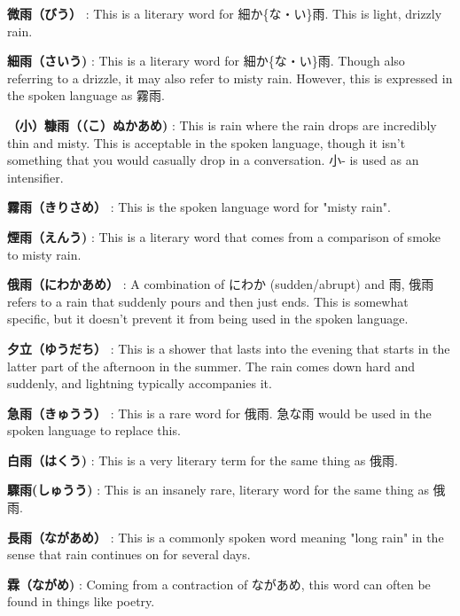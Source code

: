 \par{\textbf{微雨（びう） }: This is a literary word for 細か\{な・い\}雨. This is light, drizzly rain. }

\par{\textbf{細雨（さいう) }: This is a literary word for 細か\{な・い\}雨. Though also referring to a drizzle, it may also refer to misty rain. However, this is expressed in the spoken language as 霧雨. }

\par{\textbf{（小）糠雨（（こ）ぬかあめ) }: This is rain where the rain drops are incredibly thin and misty. This is acceptable in the spoken language, though it isn't something that you would casually drop in a conversation. 小- is used as an intensifier. }

\par{\textbf{霧雨（きりさめ） }: This is the spoken language word for "misty rain". }

\par{\textbf{煙雨（えんう) }: This is a literary word that comes from a comparison of smoke to misty rain. }

\par{\textbf{俄雨（にわかあめ） }: A combination of にわか (sudden\slash abrupt) and 雨, 俄雨 refers to a rain that suddenly pours and then just ends. This is somewhat specific, but it doesn't prevent it from being used in the spoken language. }

\par{\textbf{夕立（ゆうだち） }: This is a shower that lasts into the evening that starts in the latter part of the afternoon in the summer. The rain comes down hard and suddenly, and lightning typically accompanies it. }

\par{\textbf{急雨（きゅうう） }: This is a rare word for 俄雨. 急な雨 would be used in the spoken language to replace this. }

\par{\textbf{白雨（はくう) }: This is a very literary term for the same thing as 俄雨. }

\par{\textbf{驟雨(しゅうう) }: This is an insanely rare, literary word for the same thing as 俄雨. }

\par{\textbf{長雨（ながあめ） }: This is a commonly spoken word meaning "long rain" in the sense that rain continues on for several days. }

\par{\textbf{霖（ながめ) }: Coming from a contraction of ながあめ, this word can often be found in things like poetry. }

